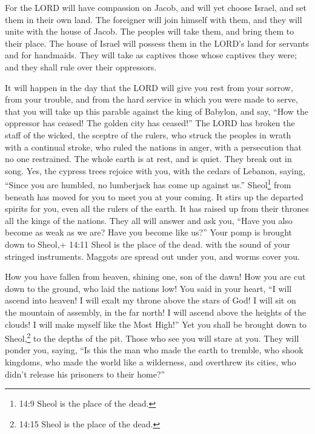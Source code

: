  For the LORD will have compassion on Jacob, and will yet
choose Israel, and set them in their own land. The foreigner will join
himself with them, and they will unite with the house of Jacob.
 The peoples will take them, and bring them to their place.
The house of Israel will possess them in the LORD's land for servants
and for handmaids. They will take as captives those whose captives they
were; and they shall rule over their oppressors.

 It will happen in the day that the LORD will give you rest
from your sorrow, from your trouble, and from the hard service in which
you were made to serve,  that you will take up this parable
against the king of Babylon, and say, ``How the oppressor has ceased!
The golden city has ceased!''  The LORD has broken the staff
of the wicked, the sceptre of the rulers,  who struck the
peoples in wrath with a continual stroke, who ruled the nations in
anger, with a persecution that no one restrained.  The whole
earth is at rest, and is quiet. They break out in song. 
Yes, the cypress trees rejoice with you, with the cedars of Lebanon,
saying, ``Since you are humbled, no lumberjack has come up against us.''
 Sheol\footnote{14:9 Sheol is the place of the dead.} from
beneath has moved for you to meet you at your coming. It stirs up the
departed spirits for you, even all the rulers of the earth. It has
raised up from their thrones all the kings of the nations. 
They all will answer and ask you, ``Have you also become as weak as we
are? Have you become like us?''  Your pomp is brought down
to Sheol,+ 14:11 Sheol is the place of the dead. with the sound of your
stringed instruments. Maggots are spread out under you, and worms cover
you.

 How you have fallen from heaven, shining one, son of the
dawn! How you are cut down to the ground, who laid the nations low!
 You said in your heart, ``I will ascend into heaven! I
will exalt my throne above the stars of God! I will sit on the mountain
of assembly, in the far north!  I will ascend above the
heights of the clouds! I will make myself like the Most High!''
 Yet you shall be brought down to Sheol,\footnote{14:15
  Sheol is the place of the dead.} to the depths of the pit.
 Those who see you will stare at you. They will ponder you,
saying, ``Is this the man who made the earth to tremble, who shook
kingdoms,  who made the world like a wilderness, and
overthrew its cities, who didn't release his prisoners to their home?''

